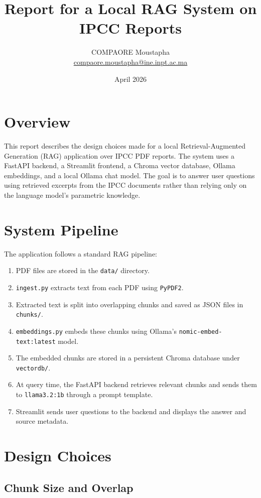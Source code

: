\documentclass[11pt,a4paper]{article}
\title{Report for a Local RAG System on IPCC Reports}
\author{COMPAORE Moustapha\\\href{mailto:compaore.moustapha@ine.inpt.ac.ma}{compaore.moustapha@ine.inpt.ac.ma}}
\date{April 2026}
\begin{document}
\maketitle

\section{Overview}

This report describes the design choices made for a local Retrieval-Augmented Generation (RAG) application over IPCC PDF reports. The system uses a FastAPI backend, a Streamlit frontend, a Chroma vector database, Ollama embeddings, and a local Ollama chat model. The goal is to answer user questions using retrieved excerpts from the IPCC documents rather than relying only on the language model's parametric knowledge.

\section{System Pipeline}

The application follows a standard RAG pipeline:

\begin{enumerate}[label=\arabic*.]
    \item PDF files are stored in the \texttt{data/} directory.
    \item \texttt{ingest.py} extracts text from each PDF using \texttt{PyPDF2}.
    \item Extracted text is split into overlapping chunks and saved as JSON files in \texttt{chunks/}.
    \item \texttt{embeddings.py} embeds these chunks using Ollama's \texttt{nomic-embed-text:latest} model.
    \item The embedded chunks are stored in a persistent Chroma database under \texttt{vectordb/}.
    \item At query time, the FastAPI backend retrieves relevant chunks and sends them to \texttt{llama3.2:1b} through a prompt template.
    \item Streamlit sends user questions to the backend and displays the answer and source metadata.
\end{enumerate}

\section{Design Choices}

\subsection{Chunk Size and Overlap}
\end{document}

